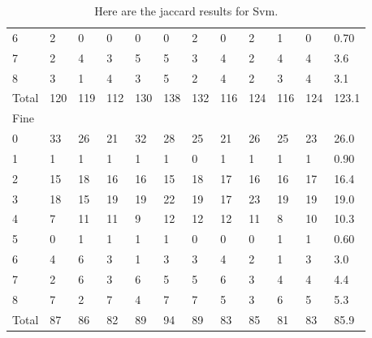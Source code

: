 \documentclass[ms]{nuthesis}
\begin{document}
\begin{table}[h]
\begin{tabular}{|l||l||l||l||l||l||l||l||l||l||l||l|}
    6 & 2 & 0 & 0 & 0 & 0 & 2 & 0 & 2 & 1 & 0 & 0.70 \\
    7 & 2 & 4 & 3 & 5 & 5 & 3 & 4 & 2 & 4 & 4 & 3.6 \\
    8 & 3 & 1 & 4 & 3 & 5 & 2 & 4 & 2 & 3 & 4 & 3.1 \\
    Total & 120 & 119 & 112 & 130 & 138 & 132 & 116 & 124 & 116 & 124 & 123.1 \\
    Fine &  &  &  &  &  &  &  &  &  &  &  \\
    0 & 33 & 26 & 21 & 32 & 28 & 25 & 21 & 26 & 25 & 23 & 26.0 \\
    1 & 1 & 1 & 1 & 1 & 1 & 0 & 1 & 1 & 1 & 1 & 0.90 \\
    2 & 15 & 18 & 16 & 16 & 15 & 18 & 17 & 16 & 16 & 17 & 16.4 \\
    3 & 18 & 15 & 19 & 19 & 22 & 19 & 17 & 23 & 19 & 19 & 19.0 \\
    4 & 7 & 11 & 11 & 9 & 12 & 12 & 12 & 11 & 8 & 10 & 10.3 \\
    5 & 0 & 1 & 1 & 1 & 1 & 0 & 0 & 0 & 1 & 1 & 0.60 \\
    6 & 4 & 6 & 3 & 1 & 3 & 3 & 4 & 2 & 1 & 3 & 3.0 \\
    7 & 2 & 6 & 3 & 6 & 5 & 5 & 6 & 3 & 4 & 4 & 4.4 \\
    8 & 7 & 2 & 7 & 4 & 7 & 7 & 5 & 3 & 6 & 5 & 5.3 \\
    Total & 87 & 86 & 82 & 89 & 94 & 89 & 83 & 85 & 81 & 83 & 85.9 \\ \bottomrule
  \end{tabular}
  \caption{Here are the jaccard results for Svm.}
  \label{tab:SVM}
\end{table}
\FloatBarrier
\end{document}
